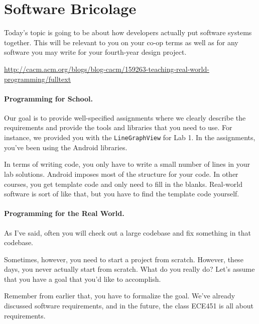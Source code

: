 




\section*{Software Bricolage}

Today's topic
is going to be about how developers actually put software systems
together.  This will be relevant to you on your co-op terms as well as
for any software you may write for your fourth-year design project.

\hfill {\small \url{http://cacm.acm.org/blogs/blog-cacm/159263-teaching-real-world-programming/fulltext}}

\paragraph{Programming for School.} Our goal is to provide well-specified assignments
where we clearly describe the requirements and provide the tools and
libraries that you need to use. For instance, we provided you with the
{\tt LineGraphView} for Lab 1. In the assignments, you've been using
the Android libraries.

In terms of writing code, you only have to write a small number of lines
in your lab solutions. Android
imposes most of the structure for your code.  In other courses, you
get template code and only need to fill in the blanks. Real-world
software is sort of like that, but you have to find the template
code yourself.

\paragraph{Programming for the Real World.} As I've said, often
you will check out a large codebase and fix something in that
codebase.

Sometimes, however, you need to start a project from scratch. 
However, these days, you never actually start from scratch.
What do you really do? Let's assume that you have a goal that
you'd like to accomplish.

Remember from earlier that, you have to formalize the goal. We've already discussed software requirements, and in the future, the class ECE451 is all about requirements.

